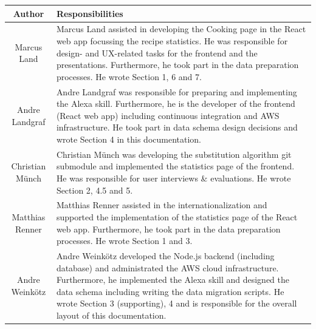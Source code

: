 \begin{table}[!h]
	\fontsize{9pt}{13pt}\selectfont
	\hspace{-5pt}
	\begin{tabularx}{\textwidth + 5pt}{| @{\hspace{3pt}} c | @{\hspace{3pt}} X |}
		\hline
		\textbf{Author} & \textbf{Responsibilities} \\
		\hline
		Marcus Land & Marcus Land assisted in developing the Cooking page in the React web app focussing the recipe statistics. He was responsible for design- and UX-related tasks for the frontend and the presentations. Furthermore, he took part in the data preparation processes. He wrote Section 1, 6 and 7.  \\
				\hline
		Andre Landgraf & Andre Landgraf was responsible for preparing and implementing the Alexa skill. Furthermore, he is the developer of the frontend (React web app) including continuous integration and AWS infrastructure. He took part in data schema design decisions and wrote Section 4 in this documentation.   \\
				\hline
		Christian Münch & Christian Münch was developing the substitution algorithm git submodule and implemented the statistics page of the frontend. He was responsible for user interviews \& evaluations. He wrote Section 2, 4.5 and 5. \\
				\hline
		Matthias Renner & Matthias Renner assisted in the internationalization and supported the implementation of the statistics page of the React web app. Furthermore, he took part in the data preparation processes. He wrote Section 1 and 3. \\
				\hline
		Andre Weinkötz & Andre Weinkötz developed the Node.js backend (including database) and administrated the AWS cloud infrastructure. Furthermore, he implemented the Alexa skill and designed the data schema including writing the data migration scripts. He wrote Section 3 (supporting), 4 and is responsible for the overall layout of this documentation. \\
		\hline
	\end{tabularx}
\end{table}

